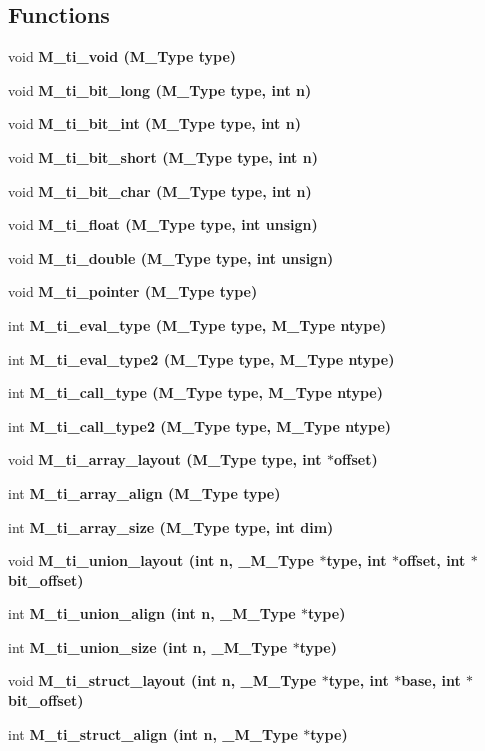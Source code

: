 \subsection*{Functions}
\begin{CompactItemize}
\item 
void \bf{M\_\-ti\_\-void} (\bf{M\_\-Type} type)
\item 
void \bf{M\_\-ti\_\-bit\_\-long} (\bf{M\_\-Type} type, int n)
\item 
void \bf{M\_\-ti\_\-bit\_\-int} (\bf{M\_\-Type} type, int n)
\item 
void \bf{M\_\-ti\_\-bit\_\-short} (\bf{M\_\-Type} type, int n)
\item 
void \bf{M\_\-ti\_\-bit\_\-char} (\bf{M\_\-Type} type, int n)
\item 
void \bf{M\_\-ti\_\-float} (\bf{M\_\-Type} type, int unsign)
\item 
void \bf{M\_\-ti\_\-double} (\bf{M\_\-Type} type, int unsign)
\item 
void \bf{M\_\-ti\_\-pointer} (\bf{M\_\-Type} type)
\item 
int \bf{M\_\-ti\_\-eval\_\-type} (\bf{M\_\-Type} type, \bf{M\_\-Type} ntype)
\item 
int \bf{M\_\-ti\_\-eval\_\-type2} (\bf{M\_\-Type} type, \bf{M\_\-Type} ntype)
\item 
int \bf{M\_\-ti\_\-call\_\-type} (\bf{M\_\-Type} type, \bf{M\_\-Type} ntype)
\item 
int \bf{M\_\-ti\_\-call\_\-type2} (\bf{M\_\-Type} type, \bf{M\_\-Type} ntype)
\item 
void \bf{M\_\-ti\_\-array\_\-layout} (\bf{M\_\-Type} type, int $\ast$offset)
\item 
int \bf{M\_\-ti\_\-array\_\-align} (\bf{M\_\-Type} type)
\item 
int \bf{M\_\-ti\_\-array\_\-size} (\bf{M\_\-Type} type, int dim)
\item 
void \bf{M\_\-ti\_\-union\_\-layout} (int n, \bf{\_\-M\_\-Type} $\ast$type, int $\ast$offset, int $\ast$bit\_\-offset)
\item 
int \bf{M\_\-ti\_\-union\_\-align} (int n, \bf{\_\-M\_\-Type} $\ast$type)
\item 
int \bf{M\_\-ti\_\-union\_\-size} (int n, \bf{\_\-M\_\-Type} $\ast$type)
\item 
void \bf{M\_\-ti\_\-struct\_\-layout} (int n, \bf{\_\-M\_\-Type} $\ast$type, int $\ast$base, int $\ast$bit\_\-offset)
\item 
int \bf{M\_\-ti\_\-struct\_\-align} (int n, \bf{\_\-M\_\-Type} $\ast$type)

\end{CompactItemize}
